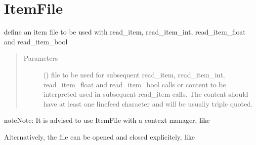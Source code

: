 \documentclass[letterpaper,10pt,english]{sphinxmanual}
\begin{document}
\section{ItemFile}
\label{\detokenize{Reference:itemfile}}

\begin{fulllineitems}
\label{\detokenize{Reference:salabim.ItemFile}}
define an item file to be used with read\_item, read\_item\_int, read\_item\_float and read\_item\_bool
\begin{quote}\begin{description}
\item[{Parameters}] \leavevmode
{} () \textendash{} file to be used for subsequent read\_item, read\_item\_int, read\_item\_float and read\_item\_bool calls 
or 
content to be interpreted used in subsequent read\_item calls. The content should have at least one linefeed
character and will be usually  triple quoted.

\end{description}\end{quote}

\begin{sphinxadmonition}{note}{Note:}
It is advised to use ItemFile with a context manager, like

\begin{sphinxVerbatim}[commandchars=\\\{\}]
   
       
       
\end{sphinxVerbatim}

Alternatively, the file can be opened and closed explicitely, like

\begin{sphinxVerbatim}[commandchars=\\\{\}]
  
  
  
\end{sphinxVerbatim}


\end{sphinxadmonition}
\end{fulllineitems}
\end{document}
